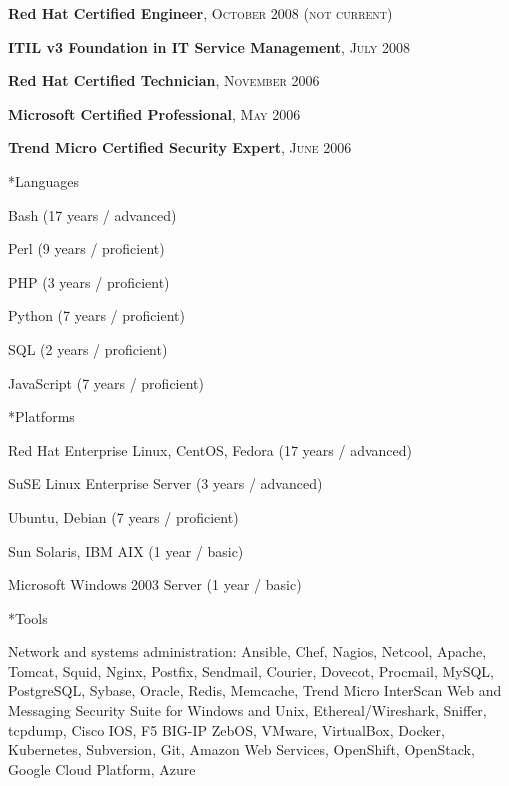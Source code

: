 \documentclass[10pt, a4paper, final]{article}
\begin{document}
\begin{section}
\begin{subsection}
\begin{compactitem}
      \item \textbf{Red Hat Certified Engineer}, \textsc{October 2008 (not current)}
      \item \textbf{ITIL v3 Foundation in IT Service Management}, \textsc{July 2008}
      \item \textbf{Red Hat Certified Technician}, \textsc{November 2006}
      \item \textbf{Microsoft Certified Professional}, \textsc{May 2006}
      \item \textbf{Trend Micro Certified Security Expert}, \textsc{June 2006}
    \end{compactitem}
  \end{subsection}
  \vspace{1em}
  \begin{subsection}*{Languages}
    \begin{compactitem}
      \item Bash (17 years / advanced) 
      \item Perl (9 years / proficient) 
      \item PHP (3 years / proficient) 
      \item Python (7 years / proficient) 
      \item SQL (2 years / proficient) 
      \item JavaScript (7 years / proficient) 
    \end{compactitem}
  \end{subsection}
  \vspace{1em}
  \begin{subsection}*{Platforms}
    \begin{compactitem}
      \item Red Hat Enterprise Linux, CentOS, Fedora (17 years / advanced) 
      \item SuSE Linux Enterprise Server (3 years / advanced) 
      \item Ubuntu, Debian (7 years / proficient) 
      \item Sun Solaris, IBM AIX (1 year / basic) 
      \item Microsoft Windows 2003 Server (1 year / basic) 
    \end{compactitem}
  \end{subsection}
  \vspace{1em}
  \begin{subsection}*{Tools}
    \begin{compactitem}
      \item Network and systems administration: Ansible, Chef, Nagios, Netcool, Apache, Tomcat, Squid, Nginx, Postfix, Sendmail, Courier, Dovecot, Procmail, MySQL, PostgreSQL, Sybase, Oracle, Redis, Memcache, Trend Micro InterScan Web and Messaging Security Suite for Windows and Unix, Ethereal/Wireshark, Sniffer, tcpdump, Cisco IOS, F5 BIG-IP ZebOS, VMware, VirtualBox, Docker, Kubernetes, Subversion, Git, Amazon Web Services, OpenShift, OpenStack, Google Cloud Platform, Azure

\end{compactitem}
\end{subsection}
\end{section}
\end{document}
